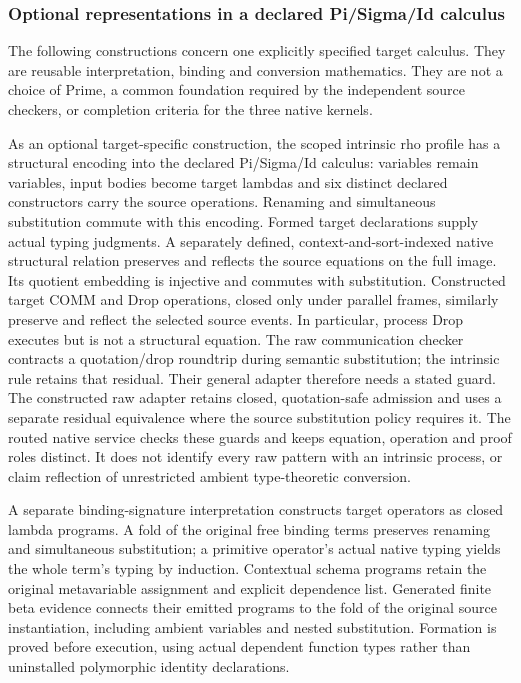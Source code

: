 \documentclass[11pt]{article}
\begin{document}
\subsubsection{Optional representations in a declared Pi/Sigma/Id calculus}
The following constructions concern one explicitly specified target calculus.
They are reusable interpretation, binding and conversion mathematics. They
are not a choice of Prime, a common foundation required by the independent
source checkers, or completion criteria for the three native kernels.

As an optional target-specific construction, the scoped intrinsic rho
profile has a structural encoding into the declared Pi/Sigma/Id calculus:
variables remain variables, input bodies become target lambdas and six distinct
declared constructors carry the source operations. Renaming and simultaneous
substitution commute with this encoding. Formed target declarations supply
actual typing judgments. A separately defined, context-and-sort-indexed native
structural relation preserves and reflects the source equations on the full
image. Its quotient embedding is injective and commutes with substitution.
Constructed target COMM and Drop operations, closed only under parallel
frames, similarly preserve and reflect the selected source events. In
particular, process Drop executes but is not a structural equation. The raw
communication checker contracts a quotation/drop roundtrip during semantic
substitution; the intrinsic rule retains that residual. Their general adapter
therefore needs a stated guard. The constructed raw adapter retains closed,
quotation-safe admission and uses a separate residual equivalence where the
source substitution policy requires it. The routed native service checks these
guards and keeps equation, operation and proof roles distinct. It does not
identify every raw pattern with an intrinsic process, or claim reflection of
unrestricted ambient type-theoretic conversion.

A separate binding-signature interpretation constructs target operators
as closed lambda programs. A fold of the original free binding terms preserves
renaming and simultaneous substitution; a primitive operator's actual native
typing yields the whole term's typing by induction. Contextual schema programs
retain the original metavariable assignment and explicit dependence list.
Generated finite beta evidence connects their emitted programs to the fold of
the original source instantiation, including ambient variables and nested
substitution. Formation is proved before execution, using actual dependent
function types rather than uninstalled polymorphic identity declarations.
\end{document}
